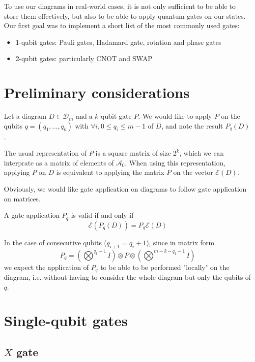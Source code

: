 To use our diagrams in real-world cases, it is not only sufficient to be able to store them effectively, but also to be able to apply quantum gates on our states. Our first goal was to implement a short list of the most commonly used gates:
\begin{itemize}
    \item 1-qubit gates: Pauli gates, Hadamard gate, rotation and phase gates
    \item 2-qubit gates: particularly CNOT and SWAP
\end{itemize}

\section{Preliminary considerations}

Let a diagram $D \in \mathcal{D}_m$ and a $k$-qubit gate $P$. We would like to apply $P$ on the qubits $q = (q_1, ..., q_k)$ with $\forall i, 0 \le q_i \le m-1$ of $D$, and note the result $P_{q}(D)$.

The usual representation of $P$ is a square matrix of size $2^k$, which we can interprate as a matrix of elements of $\mathcal{A}_0$. When using this representation, applying $P$ on $D$ is equivalent to applying the matrix $P$ on the vector $\mathcal{E}(D)$.

Obviously, we would like gate application on diagrams to follow gate application on matrices.

\begin{definition}
    A gate application $P_q$ is valid if and only if
    $$\mathcal{E}(P_q(D)) = P_q \mathcal{E}(D)$$
\end{definition}

In the case of consecutive qubits ($q_{i+1} = q_i+1$), since in matrix form
$$P_q = \left(\bigotimes^{q_1-1} I\right) \otimes P \otimes \left(\bigotimes^{m-k-q_1-1} I\right)$$
we expect the application of $P_q$ to be able to be performed "locally" on the diagram, i.e. without having to consider the whole diagram but only the qubits of $q$.

\section{Single-qubit gates}

\subsection{$X$ gate}

